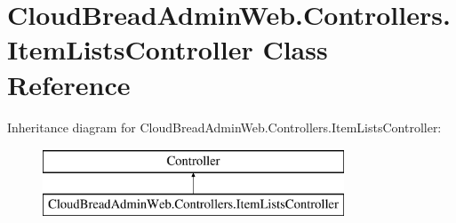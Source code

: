 \hypertarget{a00128}{}\section{Cloud\+Bread\+Admin\+Web.\+Controllers.\+Item\+Lists\+Controller Class Reference}
\label{a00128}
Inheritance diagram for Cloud\+Bread\+Admin\+Web.\+Controllers.\+Item\+Lists\+Controller\+:\begin{figure}[H]
\begin{center}
\leavevmode
\includegraphics[height=2.000000cm]{a00128}
\end{center}
\end{figure}

